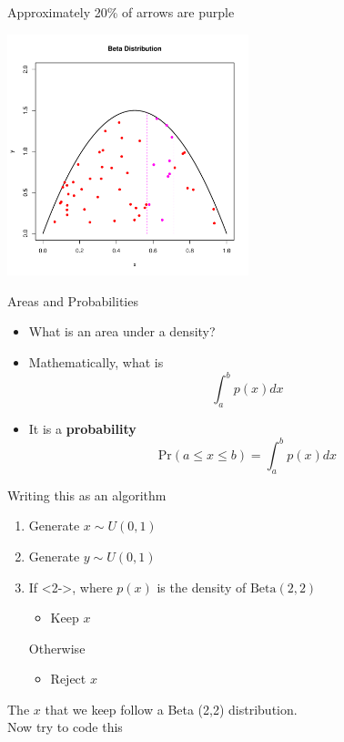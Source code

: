 \documentclass
[handout]
{beamer}
\begin{document}
\begin{frame}{Approximately 20\% of arrows are purple}
\begin{center}
\includegraphics[height=7cm]{./Pics/bet6.pdf}
\end{center}
\end{frame}
\begin{frame}{Areas and Probabilities}
\begin{itemize}
\item What is an area under a density?
\pause
\item Mathematically, what is
\begin{equation*}
\int_a^b p(x)dx
\end{equation*}
\pause
\item It is a {\bf probability}
\begin{equation*}
\mbox{Pr}(a\leq x\leq b)=\int_a^b p(x)dx
\end{equation*}
\end{itemize}
\end{frame}
\begin{frame}{Writing this as an algorithm}
\begin{enumerate}
\item Generate $x\sim U(0,1)$
\item Generate $y\sim U(0,1)$
\item If <2->, where $p(x)$ is the density of $\mbox{Beta}(2,2)$ 
\begin{itemize}
\item Keep $x$ 
\end{itemize}
Otherwise
\begin{itemize}
\item Reject $x$ 
\end{itemize}
\end{enumerate}
\pause\pause The $x$ that we keep follow a Beta (2,2) distribution.\\  \pause Now try to code this
\end{frame}
\end{document}
